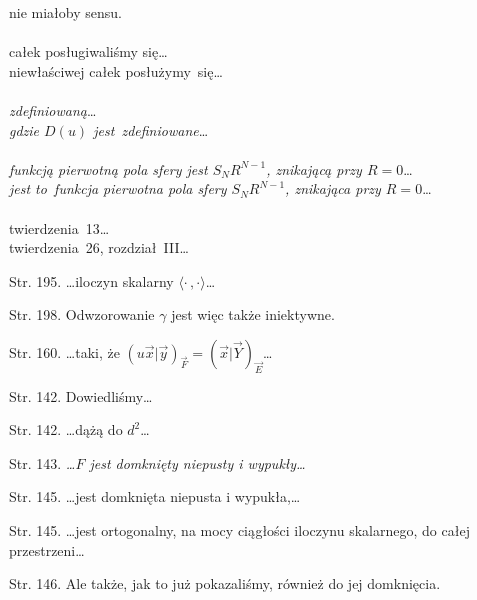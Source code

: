 \documentclass[a4paper,11pt]{article}
\begin{document}
\Powin  nie miałoby sensu. \\
 \\
\Jest całek posługiwaliśmy się\ldots \\
\Powin  niewłaściwej całek posłużymy~się\ldots \\
 \\
\Jest  \textit{zdefiniowaną}\ldots \\
\Powin \textit{gdzie $D( u )$ jest~zdefiniowane}\ldots \\
 \\
\Jest  \textit{funkcją pierwotną pola sfery jest $S_{ N } R^{ N - 1 }$,
  znikającą przy $R = 0$}\ldots \\
\Powin \textit{jest to~funkcja pierwotna pola sfery
  $S_{ N } R^{ N - 1 }$,
  znikająca przy $R = 0$}\ldots \\
 \\
\Jest twierdzenia~13\ldots \\
\Powin twierdzenia~26, rozdział~III\ldots \\

\vspace{\spaceTwo}
















\start Str. 195. \ldots iloczyn skalarny
$\langle \cdot \,, \cdot \rangle$\ldots

\start Str. 198. Odwzorowanie $\gamma$ jest więc także iniektywne.

\start Str. 160. \ldots taki, że
$( u\vec{ x } | \vec{ y } )_{ \vec{ F } } = ( \vec{ x } | \vec{ Y }
)_{ \vec{ E } }$\ldots

\start Str. 142. Dowiedliśmy\ldots

\start Str. 142. \ldots dążą do $d^{ 2 }$\ldots

\start Str. 143. \textit{\ldots$F$ jest domknięty niepusty i
  wypukły\ldots}

\start Str. 145. \ldots jest domknięta niepusta i wypukła,\ldots

\start Str. 145. \ldots jest ortogonalny, na mocy ciągłości iloczynu
skalarnego, do całej przestrzeni\ldots

\start Str. 146. Ale także, jak to już pokazaliśmy, również do jej
domknięcia.
\end{document}
